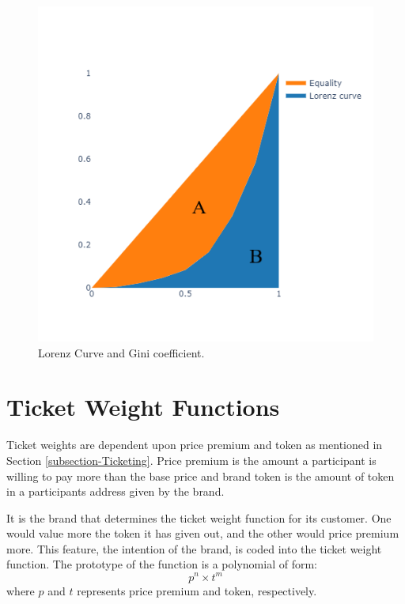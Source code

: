 \documentclass[runningheads]{llncs}
\begin{document}
\begin{figure}[H]
\centering
\includegraphics[scale=0.7]{Figures_and_Tables/LorenzCurve.png}
\caption{Lorenz Curve and Gini coefficient.}
\label{fig:Lorenz}
\end{figure}



\section{Ticket Weight Functions}\label{APP-TWF}
Ticket weights are dependent upon price premium and token as mentioned in Section \ref{subsection-Ticketing}. Price premium is the amount a participant is willing to pay more than the base price and brand token is the amount of token in a participants address given by the brand.

It is the brand that determines the ticket weight function for its customer. One would value more the token it has given out, and the other would price premium more. This feature, the intention of the brand, is coded into the ticket weight function. The prototype of the function is a polynomial of form:
$$
p^n \times t^m
$$
where $p$ and $t$ represents price premium and token, respectively.
\end{document}
